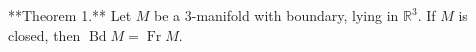 **Theorem 1.** Let $M$ be a 3-manifold with boundary, lying in $\mathbb{R}^3$. If $M$ is closed, then $\operatorname{Bd} M = \operatorname{Fr} M$.
